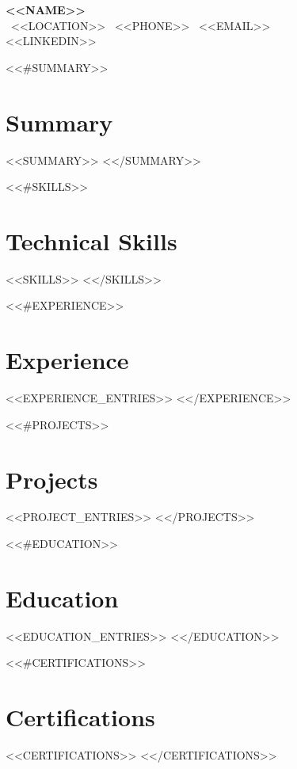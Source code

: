 \documentclass[10pt,a4paper]{article}
\begin{document}
\begin{center}
  {\LARGE\textbf{<<NAME>>}} \\[3pt]
  \small
  \faMapMarker\ {<<LOCATION>>} \hfill \faPhone\ {<<PHONE>>} \hfill \faEnvelope\ {<<EMAIL>>} \\[2pt]
  {<<LINKEDIN>>}  
\end{center}

<<#SUMMARY>>
\section{Summary}
<<SUMMARY>>
<</SUMMARY>>

<<#SKILLS>>
\section{Technical Skills}
<<SKILLS>>
<</SKILLS>>

<<#EXPERIENCE>>
\section{Experience}
<<EXPERIENCE_ENTRIES>>
<</EXPERIENCE>>

<<#PROJECTS>>
\section{Projects}
<<PROJECT_ENTRIES>>
<</PROJECTS>>

<<#EDUCATION>>
\section{Education}
<<EDUCATION_ENTRIES>>
<</EDUCATION>>

<<#CERTIFICATIONS>>
\section{Certifications}
<<CERTIFICATIONS>>
<</CERTIFICATIONS>>
\end{document}
